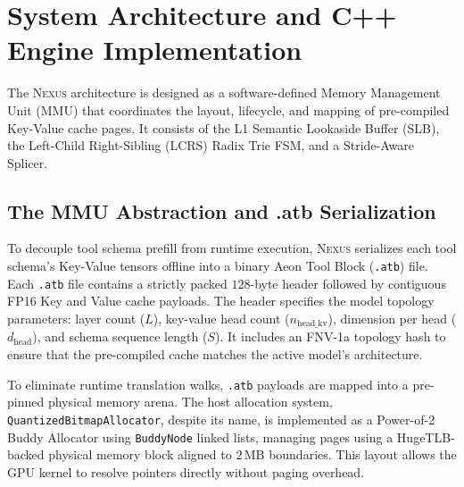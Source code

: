 \section{System Architecture and C++ Engine Implementation}
\label{sec:architecture}

The \textsc{Nexus} architecture is designed as a software-defined Memory Management Unit (MMU) that coordinates the layout, lifecycle, and mapping of pre-compiled Key-Value cache pages. It consists of the L1 Semantic Lookaside Buffer (SLB), the Left-Child Right-Sibling (LCRS) Radix Trie FSM, and a Stride-Aware Splicer.

\subsection{The MMU Abstraction and .atb Serialization}
To decouple tool schema prefill from runtime execution, \textsc{Nexus} serializes each tool schema's Key-Value tensors offline into a binary Aeon Tool Block (\texttt{.atb}) file. Each \texttt{.atb} file contains a strictly packed $128$-byte header followed by contiguous FP16 Key and Value cache payloads. The header specifies the model topology parameters: layer count ($L$), key-value head count ($n_{\text{head\_kv}}$), dimension per head ($d_{\text{head}}$), and schema sequence length ($S$). It includes an FNV-1a topology hash to ensure that the pre-compiled cache matches the active model's architecture.

To eliminate runtime translation walks, \texttt{.atb} payloads are mapped into a pre-pinned physical memory arena. The host allocation system, \texttt{QuantizedBitmapAllocator}, despite its name, is implemented as a Power-of-2 Buddy Allocator using \texttt{BuddyNode} linked lists, managing pages using a HugeTLB-backed physical memory block aligned to $2\,\text{MB}$ boundaries. This layout allows the GPU kernel to resolve pointers directly without paging overhead.


